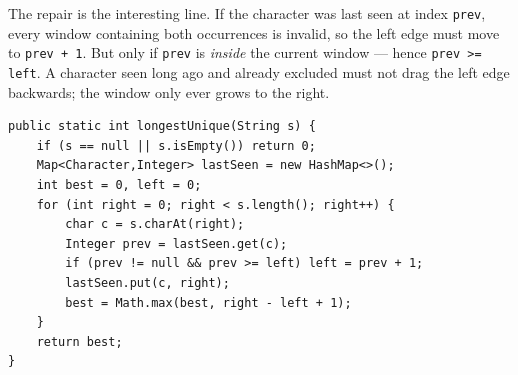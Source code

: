 The repair is the interesting line. If the character was last seen at index
\texttt{prev}, every window containing both occurrences is invalid, so the
left edge must move to \texttt{prev + 1}. But only if \texttt{prev} is
\emph{inside} the current window --- hence \texttt{prev >= left}. A character
seen long ago and already excluded must not drag the left edge backwards; the
window only ever grows to the right.

\solheading
\begin{lstlisting}[style=java]
public static int longestUnique(String s) {
    if (s == null || s.isEmpty()) return 0;
    Map<Character,Integer> lastSeen = new HashMap<>();
    int best = 0, left = 0;
    for (int right = 0; right < s.length(); right++) {
        char c = s.charAt(right);
        Integer prev = lastSeen.get(c);
        if (prev != null && prev >= left) left = prev + 1;
        lastSeen.put(c, right);
        best = Math.max(best, right - left + 1);
    }
    return best;
}
\end{lstlisting}

